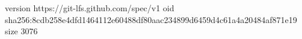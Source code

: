 version https://git-lfs.github.com/spec/v1
oid sha256:8cdb258e4dfd1464112e60488df80aac234899d6459d4c61a4a20484af871e19
size 3076
